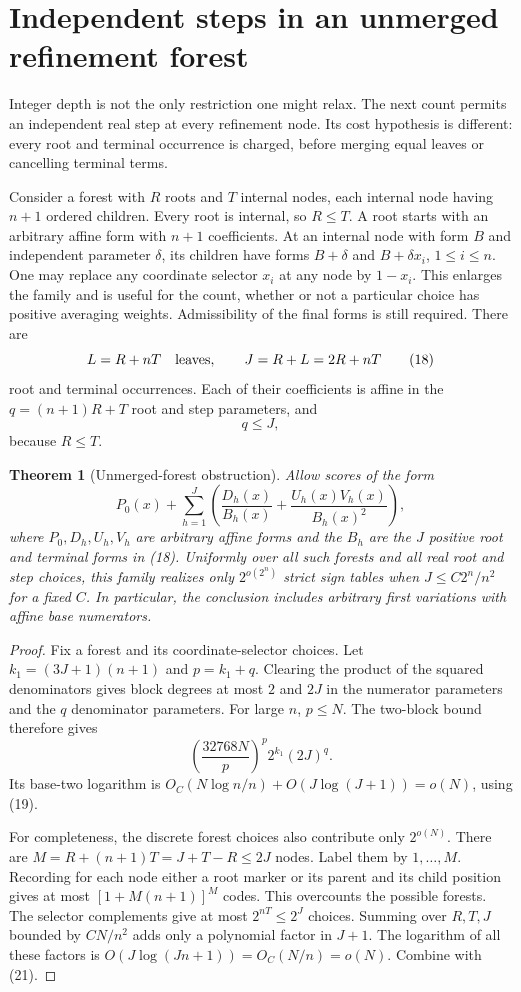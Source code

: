 \documentclass[11pt]{article}
\newtheorem{theorem}{Theorem}
\begin{document}
\section{Independent steps in an unmerged refinement forest}

Integer depth is not the only restriction one might relax. The next
count permits an independent real step at every refinement node.
Its cost hypothesis is different: every root and terminal occurrence
is charged, before merging equal leaves or cancelling terminal terms.

Consider a forest with $R$ roots and $T$ internal nodes, each internal
node having $n+1$ ordered children. Every root is internal, so $R\le T$.
A root starts with an arbitrary affine form with $n+1$ coefficients.
At an internal node with form $B$ and independent parameter $\delta$,
its children have forms $B+\delta$ and $B+\delta x_i$, $1\le i\le n$.
One may replace any coordinate selector $x_i$ at any node by $1-x_i$.
This enlarges the family and is useful for the count, whether or not
a particular choice has positive averaging weights. Admissibility of
the final forms is still required. There are
\[
                    L=R+nT\quad\hbox{leaves},\qquad
                    J=R+L=2R+nT
 \tag{18}
\]
root and terminal occurrences. Each of their coefficients is affine
in the $q=(n+1)R+T$ root and step parameters, and
\[
                         q\le J,
 \tag{19}
\]
because $R\le T$.

\begin{theorem}[Unmerged-forest obstruction]
Allow scores of the form
\[
 P_0(x)+\sum_{h=1}^J\left(\frac{D_h(x)}{B_h(x)}+
                      \frac{U_h(x)V_h(x)}{B_h(x)^2}\right),
 \tag{20}
\]
where $P_0,D_h,U_h,V_h$ are arbitrary affine forms and the $B_h$
are the $J$ positive root and terminal forms in (18). Uniformly over
all such forests and all real root and step choices, this family
realizes only $2^{o(2^n)}$ strict sign tables when
$J\le C2^n/n^2$ for a fixed $C$. In particular, the conclusion
includes arbitrary first variations with affine base numerators.
\end{theorem}
\begin{proof}
Fix a forest and its coordinate-selector choices. Let
$k_1=(3J+1)(n+1)$ and $p=k_1+q$. Clearing the product of the
squared denominators gives block degrees at most $2$ and $2J$ in
the numerator parameters and the $q$ denominator parameters. For
large $n$, $p\le N$. The two-block bound therefore gives
\[
       \left(\frac{32768N}{p}\right)^p2^{k_1}(2J)^q.
 \tag{21}
\]
Its base-two logarithm is $O_C(N\log n/n)+O(J\log(J+1))=o(N)$,
using (19).

For completeness, the discrete forest choices also contribute only
$2^{o(N)}$. There are $M=R+(n+1)T=J+T-R\le2J$ nodes.
Label them by $1,\ldots,M$. Recording for each node either a root
marker or its parent and its child position gives at most
$[1+M(n+1)]^M$ codes. This overcounts the possible forests. The
selector complements give at most $2^{nT}\le2^J$ choices. Summing
over $R,T,J$ bounded by $C N/n^2$ adds only a polynomial factor in
$J+1$. The logarithm of all these factors is
$O(J\log(Jn+1))=O_C(N/n)=o(N)$. Combine with (21).
\end{proof}
\end{document}
